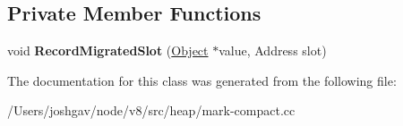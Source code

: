 \subsection*{Private Member Functions}
\begin{DoxyCompactItemize}
\item 
void {\bfseries Record\+Migrated\+Slot} (\hyperlink{classv8_1_1internal_1_1_object}{Object} $\ast$value, Address slot)\hypertarget{classv8_1_1internal_1_1_record_migrated_slot_visitor_abaeced6ce63342c4c4409aeff79c5a09}{}\label{classv8_1_1internal_1_1_record_migrated_slot_visitor_abaeced6ce63342c4c4409aeff79c5a09}

\end{DoxyCompactItemize}


The documentation for this class was generated from the following file\+:\begin{DoxyCompactItemize}
\item 
/\+Users/joshgav/node/v8/src/heap/mark-\/compact.\+cc\end{DoxyCompactItemize}
